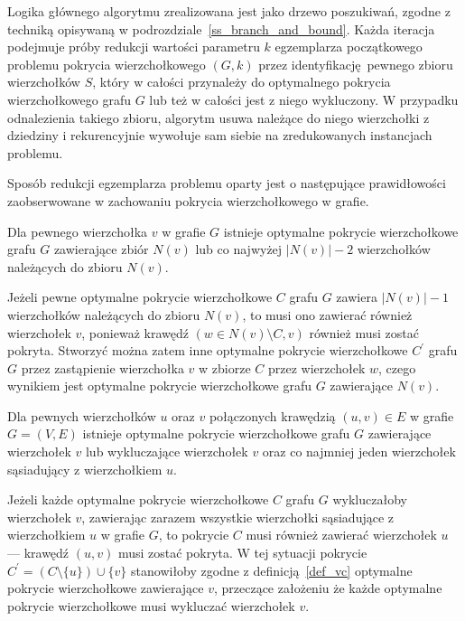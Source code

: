 \par{
  Logika głównego algorytmu zrealizowana jest jako drzewo poszukiwań, zgodne z techniką opisywaną w podrozdziale~\ref{ss_branch_and_bound}.
  Każda iteracja podejmuje próby redukcji wartości parametru $k$ egzemplarza początkowego problemu pokrycia wierzchołkowego $(G, k)$ przez identyfikację pewnego zbioru wierzchołków $S$, który w całości przynależy do optymalnego pokrycia wierzchołkowego grafu $G$ lub też w całości jest z niego wykluczony.
  W przypadku odnalezienia takiego zbioru, algorytm usuwa należące do niego wierzchołki z dziedziny i rekurencyjnie wywołuje sam siebie na zredukowanych instancjach problemu.

  Sposób redukcji egzemplarza problemu oparty jest o następujące prawidłowości zaobserwowane w zachowaniu pokrycia wierzchołkowego w grafie.
  \begin{theorem}
    Dla pewnego wierzchołka $v$ w grafie $G$ istnieje optymalne pokrycie wierzchołkowe grafu $G$ zawierające zbiór $N(v)$ lub co najwyżej $|N(v)| - 2$ wierzchołków należących do zbioru $N(v)$.
  \end{theorem}
  \begin{bproof}
    Jeżeli pewne optymalne pokrycie wierzchołkowe $C$ grafu $G$ zawiera $|N(v)|-1$ wierzchołków należących do zbioru $N(v)$, to musi ono zawierać również wierzchołek $v$, ponieważ krawędź $(w \in N(v) \setminus C, v)$ również musi zostać pokryta.
    Stworzyć można zatem inne optymalne pokrycie wierzchołkowe $C^\prime$ grafu $G$ przez zastąpienie wierzchołka $v$ w zbiorze $C$ przez wierzchołek $w$, czego wynikiem jest optymalne pokrycie wierzchołkowe grafu $G$ zawierające $N(v)$.
  \end{bproof}
  \begin{theorem}
    Dla pewnych wierzchołków $u$ oraz $v$ połączonych krawędzią $(u, v) \in E$ w grafie $G=(V, E)$ istnieje optymalne pokrycie wierzchołkowe grafu $G$ zawierające wierzchołek $v$ lub wykluczające wierzchołek $v$ oraz co najmniej jeden wierzchołek sąsiadujący z wierzchołkiem $u$.
  \end{theorem}
  \begin{bproof}
    Jeżeli każde optymalne pokrycie wierzchołkowe $C$ grafu $G$ wykluczałoby wierzchołek $v$, zawierając zarazem wszystkie wierzchołki sąsiadujące z wierzchołkiem $u$ w grafie $G$, to pokrycie $C$ musi również zawierać wierzchołek $u$ --- krawędź $(u, v)$ musi zostać pokryta.
    W tej sytuacji pokrycie $C^\prime=(C \setminus \{u\}) \cup \{v\}$ stanowiłoby zgodne z definicją~\ref{def_vc} optymalne pokrycie wierzchołkowe zawierające $v$, przeczące założeniu że każde optymalne pokrycie wierzchołkowe musi wykluczać wierzchołek $v$.

\end{bproof}}

